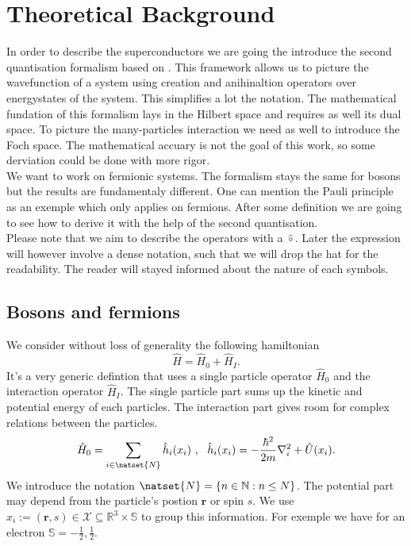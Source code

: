 \documentclass[../main.tex]{subfile}
\begin{document}
 \normalsize

\section{Theoretical Background}
In order to describe the superconductors we are going the introduce the second quantisation formalism based on \cite{Folk2014}.
This framework allows us to picture the wavefunction of a system using creation and anihinaltion operators over
energystates of the system. This simplifies a lot the notation. The mathematical fundation of this formalism
lays in the Hilbert space and requires as well its dual space. To picture the many-particles interaction we need as well
to introduce the Foch space. The mathematical accuary is not the goal of this work, so some derviation could be done with more rigor.\\

We want to work on fermionic systems. The formalism stays the same for 
bosons but the results are fundamentaly different. One can mention the Pauli principle as an exemple which
only applies on fermions. After some definition we are going to see how to derive it with the help of the second quantisation.\\ 

Please note that we aim to describe the operators with a $\hat{\circ}$.
Later the expression will however involve a dense notation, such that we will drop the hat for the readability. The reader will stayed
informed about the nature of each symbols. \\

\subsection{Bosons and fermions}
We consider without loss of generality the following hamiltonian
\begin{equation}\label{eq:MasterHamiltonian}
    \hat{H} = \hat{H}_0 + \hat{H}_I.
\end{equation}
It's a very generic defintion that uses a single particle operator $\hat{H}_0$ and the interaction operator $\hat{H}_I$. The single 
particle part sums up the kinetic and potential energy of each particles. The interaction part gives room for complex relations
between the particles.\\ 
\[
    \hat{H}_0 = \sum_{i\in \natset{N}} \hat{h}_i(x_i)~,~~ \hat{h}_i(x_i) = -\frac{\hbar^2}{2m}\nabla_i^2 + \hat{U}(x_i).
\]
We introduce the notation $\natset{N} = \{n \in \mathbb{N}: n\leq N\}$. The potential part may depend from the particle's postion $\bm{r}$ or spin $s$. 
We use $x_i := (\bm{r}, s) \in \mathcal{X}\subseteq\mathbb{R}^{3}\times\mathbb{S}$ to group this information. For exemple we have for an electron 
$\mathbb{S}= {-\frac{1}{2},\frac{1}{2}}$.\\
\end{document}
